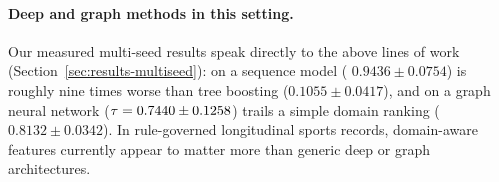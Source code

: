 \paragraph{Deep and graph methods in this setting.} Our measured multi-seed
results speak directly to the above lines of work
(Section~\ref{sec:results-multiseed}): on  a sequence model
(\maelog{} $0.9436\pm0.0754$) is roughly nine times worse than tree boosting
($0.1055\pm0.0417$), and on  a graph neural network
($\tau=0.7440\pm0.1258$) trails a simple domain ranking
($0.8132\pm0.0342$). In rule-governed longitudinal sports records, domain-aware
features currently appear to matter more than generic deep or graph
architectures.
